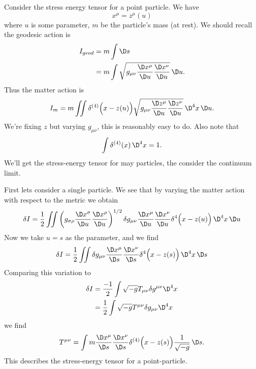 
Consider the stress energy tensor for a point particle. We have
\begin{equation}
x^{\mu}=z^{\mu}(u)
\end{equation}
where $u$ is some parameter, $m$ be the particle's mass (at
rest). We should recall the geodesic action is
\begin{equation}
\begin{split}
I_{geod}
&=m\int\D s\\
&=m\int\sqrt{g_{\mu\nu}\frac{\D x^{\mu}}{\D u}
\frac{\D x^{\nu}}{\D u}}\,\D u.
\end{split}
\end{equation}
Thus the matter action is
\begin{equation}
I_{m}=m\iint\delta^{(4)}\Bigl(x-z(u)\Bigr)\sqrt{g_{\mu\nu}\frac{\D z^{\mu}}{\D
u}\frac{\D z^{\nu}}{\D u}}\,\D^{4}x\,\D u.
\end{equation}
We're fixing $z$ but varying $g_{\mu\nu}$, this is reasonably easy
to do. Also note that
\begin{equation}
\int\delta^{(4)}(x)\,\D^{4}x=1.
\end{equation}
We'll get the stress-energy tensor for may particles, the
consider the continuum limit.

First lets consider a single particle. We see that by varying the
matter action with respect to the metric we obtain
\begin{equation}
\delta I
=\frac{1}{2}\iint\left(g_{\sigma\rho}\frac{\D x^{\sigma}}{\D u}
\frac{\D x^{\rho}}{\D u}\right)^{1/2}
\delta g_{\mu\nu}\frac{\D x^{\mu}}{\D u}\frac{\D x^{\nu}}{\D u}\delta^{4}\Bigl(x-z(u)\Bigr)\,\D^{4}x\,
\D u
\end{equation}
Now we take $u=s$ as the parameter, and we find
\begin{equation}
\delta I=\frac{1}{2}\iint\delta g_{\mu\nu}\frac{\D x^{\mu}}{\D s}\frac{\D x^{\nu}}{\D s}\delta^{4}\Bigl(x-z(s)\Bigr)\,\D^{4}x\,
\D s
\end{equation}
Comparing this variation to
\begin{equation}
\begin{split}
\delta I
&=\frac{-1}{2}\int\sqrt{-g}T_{\mu\nu}\delta g^{\mu\nu}\D^{4}x\\
&=\frac{1}{2}\int\sqrt{-g}T^{\mu\nu}\delta g_{\mu\nu}\D^{4}x
\end{split}
\end{equation}
we find
\begin{equation}
T^{\mu\nu}=\int m\frac{\D x^{\mu}}{\D s}\frac{\D x^{\nu}}{\D s}
\delta^{(4)}\Bigl(x-z(s)\Bigr)\frac{1}{\sqrt{-g}}\,\D s.
\end{equation}
This describes the stress-energy tensor for a point-particle.

